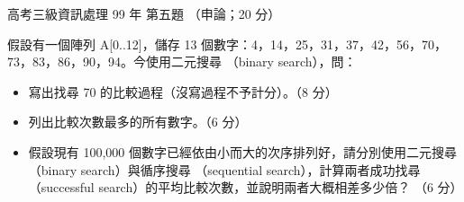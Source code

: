 \begin{pastexam}[label={px:gk3-099-ds-05}]{高考三級資訊處理 99 年 第五題}
（申論；20 分）

假設有一個陣列 A[0..12]，儲存 13 個數字：4，14，25，31，37，42，56，70，73，83，86，90，94。今使用二元搜尋
（binary search），問：
\begin{itemize}[leftmargin=2.2em]
\item[㈠] 寫出找尋 70 的比較過程（沒寫過程不予計分）。（8 分）
\item[㈡] 列出比較次數最多的所有數字。（6 分）
\item[㈢] 假設現有 100,000 個數字已經依由小而大的次序排列好，請分別使用二元搜尋（binary search）與循序搜尋
（sequential search），計算兩者成功找尋（successful search）的平均比較次數，並說明兩者大概相差多少倍？
（6 分）
\end{itemize}
\end{pastexam}

